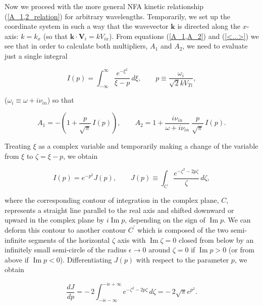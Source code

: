 \documentclass[draft]{agujournal2019}
\renewcommand{\vec}{\mathbf}
\begin{document}
{Now we proceed with the more general NFA kinetic relationship
(\ref{A_1,2_relation}) for arbitrary wavelengths. Temporarily, we set up the
coordinate system in such a way that the wavevector $\vec{k}$ 
is directed along the $x$-axis: $k=k_{x}$ (so that $\vec
{k} \cdot \vec{V}_{i}=kV_{ix}$). From equations (\ref{A_1,A_2}) and
(\ref{<...>}) we see that in order to calculate both multipliers, $A_{1}$ and
$A_{2}$, we need to evaluate just a single integral
\begin{linenomath*}
\begin{equation}
I(p)=\int_{-\infty}^{\infty}\frac{e^{-\xi^{2}}}{\xi-p}\,d\xi,\qquad
p\equiv\frac{\omega_{i}}{\sqrt{2}kV_{Ti}}, 
\label{II(a)}
\end{equation}
\end{linenomath*}
($\omega_{i}\equiv\omega + i\nu_{in}$) so that
\begin{linenomath*}
\begin{equation}
A_{1}=-\left(  1+\frac{p}{\sqrt{\pi}}\,I(p)\right)  ,\qquad A_{2}=1+\frac
{i\nu_{in}}{\omega+i\nu_{in}}\ \frac{p}{\sqrt{\pi}}\,I(p). 
\label{A_1,A_2_Int}
\end{equation}
\end{linenomath*}
Treating $\xi$ as a complex variable and temporarily making a change of the
variable from $\xi$ to $\zeta=\xi-p$, we obtain
\begin{linenomath*}
\begin{equation}
I(p)=e^{-p^{2}}J(p),\qquad J(p)\equiv\int_{C}\frac{e^{-\zeta^{2}-2p\zeta}
}{\zeta}\,d\zeta, 
\label{I_via_J}
\end{equation}
\end{linenomath*}
where the corresponding contour of integration in the complex plane, $C$,
represents a straight line parallel to the real axis and shifted downward or
upward in the complex plane by $i\operatorname{Im}p$, depending on the sign
of $\operatorname{Im}p$. We can deform this contour to another contour
$C^{\prime}$ which is composed of the two semi-infinite segments of the
horizontal $\zeta$ axis with $\operatorname{Im}\zeta=0$ closed from below by
an infinitely small semi-circle of the radius $\epsilon\rightarrow0$ around
$\zeta=0$ if $\operatorname{Im}p>0$ (or from above if $\operatorname{Im}p<0$).
Differentiating $J(p)$ with respect to the parameter $p$, we obtain
\begin{linenomath*}
\[
\frac{dJ}{dp}=-\,2\int_{-i\epsilon-\infty}^{-i\epsilon+\infty}e^{-\zeta
^{2}-2p\zeta}\,d\zeta=-\,2\sqrt{\pi}e^{p^{2}}.
\]
\end{linenomath*}
}
\end{document}
